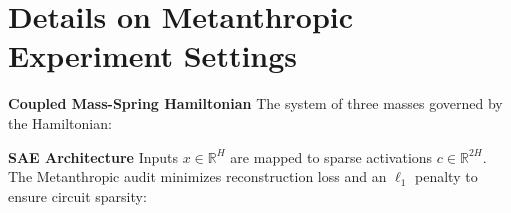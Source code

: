 \renewcommand\thefigure{S.\arabic{figure}}
\setcounter{figure}{0}
\section{Details on Metanthropic Experiment Settings}

\textbf{Coupled Mass-Spring Hamiltonian} The system of three masses governed by the Hamiltonian:

\textbf{SAE Architecture} Inputs $x \in \mathbb{R}^H$ are mapped to sparse activations $c \in \mathbb{R}^{2H}$. The Metanthropic audit minimizes reconstruction loss and an $\ell_1$ penalty to ensure circuit sparsity: